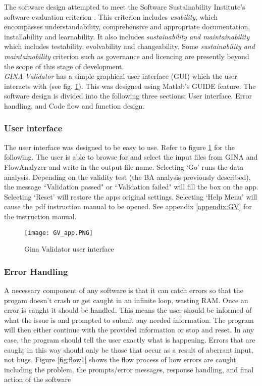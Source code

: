 \documentclass[12pt, openany, oneside]{book}
\begin{document}
The software design attempted to meet the Software Sustainability Institute's software evaluation criterion \citep{soft}. This criterion includes \textit{usability}, which encompasses understandability, comprehensive and appropriate documentation, installability and learnability. It also includes \textit{sustainability and maintainability} which includes testability, evolvability and changeability. Some \textit{sustainability and maintainability} criterion such as governance and licencing are presently beyond the scope of this stage of development.\\

\textit{GINA Validator} has a simple graphical user interface (GUI) which the user interacts with (see fig. \ref{fig:gvgui}). This was designed using Matlab's GUIDE feature.  The software design is divided into the following three sections: User interface, Error handling, and Code flow and function design.

\subsubsection{User interface}
The user interface was designed to be easy to use. Refer to figure \ref{fig:gvgui} for the following. The user is able to browse for and select the input files from GINA and FlowAnalyzer and write in the output file name. Selecting `Go' runs the data analysis. Depending on the validity test (the BA analysis previously described), the message ``Validation passed" or ``Validation failed" will fill the box on the app. Selecting `Reset' will restore the apps original settings. Selecting `Help Menu' will cause the pdf instruction manual to be opened. See appendix \ref{appendix:GV} for the instruction manual.

\begin{figure}
\begin{center}	
		\texttt{[image: GV\_app.PNG]}	
		\caption{Gina Validator user interface}
		\label{fig:gvgui}		
	\end{center}

\end{figure}

\subsubsection{Error Handling}
A necessary component of any software is that it can catch errors so that the progam doesn't crash or get caught in an infinite loop, wasting RAM. Once an error is caught it should be handled. This means the user should be informed of what the issue is and prompted to submit any needed information. The program will then either continue with the provided information or stop and reset. In any case, the program should tell the user exactly what is happening. Errors that are caught in this way should only be those that occur as a result of aberrant input, not bugs. Figure \ref{fig:flow1} shows the flow process of how errors are caught including the problem, the prompts/error messages, response handling, and final action of the software
\end{document}
